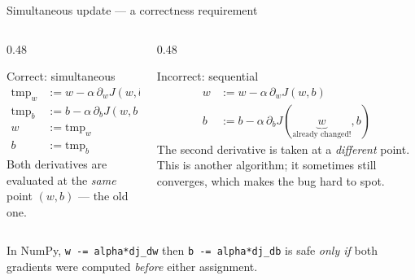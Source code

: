 \documentclass[aspectratio=169,11pt]{beamer}
\begin{document}
\begin{frame}{Simultaneous update --- a correctness requirement}
  \begin{columns}[T,onlytextwidth]
    \begin{column}{0.48\textwidth}
      \begin{block}{Correct: simultaneous}
        \begin{align*}
          \text{tmp}_w &:= w-\alpha\,\partial_w J(w,b)\\
          \text{tmp}_b &:= b-\alpha\,\partial_b J(w,b)\\
          w &:= \text{tmp}_w\\
          b &:= \text{tmp}_b
        \end{align*}
        \footnotesize Both derivatives are evaluated at the \emph{same} point
        $(w,b)$ --- the old one.
      \end{block}
    \end{column}
    \begin{column}{0.48\textwidth}
      \begin{alertblock}{Incorrect: sequential}
        \begin{align*}
          w &:= w-\alpha\,\partial_w J(w,b)\\
          b &:= b-\alpha\,\partial_b J(\underbrace{w}_{\text{already changed!}},b)
        \end{align*}
        \footnotesize The second derivative is taken at a \emph{different} point.
        This is another algorithm; it sometimes still converges, which makes the
        bug hard to spot.
      \end{alertblock}
    \end{column}
  \end{columns}
  \begin{pitfall}
    \footnotesize In NumPy, \texttt{w -= alpha*dj\_dw} then
    \texttt{b -= alpha*dj\_db} is safe \emph{only if} both gradients were
    computed \emph{before} either assignment.
  \end{pitfall}
\end{frame}
\end{document}
